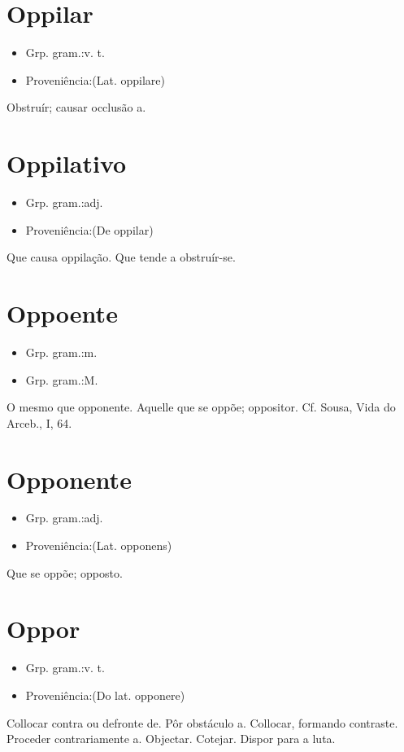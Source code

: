 \section{Oppilar}
\begin{itemize}
\item {Grp. gram.:v. t.}
\end{itemize}
\begin{itemize}
\item {Proveniência:(Lat. \textunderscore oppilare\textunderscore )}
\end{itemize}
Obstruír; causar occlusão a.
\section{Oppilativo}
\begin{itemize}
\item {Grp. gram.:adj.}
\end{itemize}
\begin{itemize}
\item {Proveniência:(De \textunderscore oppilar\textunderscore )}
\end{itemize}
Que causa oppilação.
Que tende a obstruír-se.
\section{Oppoente}
\begin{itemize}
\item {Grp. gram.:m.}
\end{itemize}
\begin{itemize}
\item {Grp. gram.:M.}
\end{itemize}
O mesmo que \textunderscore opponente\textunderscore .
Aquelle que se oppõe; oppositor. Cf. Sousa, \textunderscore Vida do Arceb.\textunderscore , I, 64.
\section{Opponente}
\begin{itemize}
\item {Grp. gram.:adj.}
\end{itemize}
\begin{itemize}
\item {Proveniência:(Lat. \textunderscore opponens\textunderscore )}
\end{itemize}
Que se oppõe; opposto.
\section{Oppor}
\begin{itemize}
\item {Grp. gram.:v. t.}
\end{itemize}
\begin{itemize}
\item {Proveniência:(Do lat. \textunderscore opponere\textunderscore )}
\end{itemize}
Collocar contra ou defronte de.
Pôr obstáculo a.
Collocar, formando contraste.
Proceder contrariamente a.
Objectar.
Cotejar.
Dispor para a luta.
